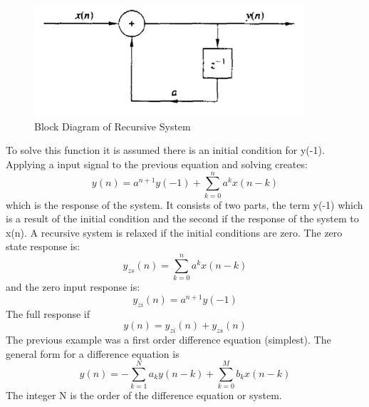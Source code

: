 \documentclass{article} %
\begin{document}
	\begin{figure}[h]
    \centering
	\includegraphics[width=10cm]{feed}
	\caption{Block Diagram of Recursive System}
	\end{figure}
	To solve this function it is assumed there is an initial condition for y(-1). Applying a input signal to the previous equation and solving creates:
	\begin{equation}
 	y(n) = a^{n+1}y(-1) + \sum_{k=0}^{n}a^kx(n-k)
	\end{equation}
	which is the response of the system. It consists of two parts, the term y(-1) which is a result of the initial condition and the second if the response of the system to x(n). A recursive system is relaxed if the initial conditions are zero. The zero state response is:
	\begin{equation}
 	y_{zs}(n) = \sum_{k=0}^{n}a^kx(n-k)
	\end{equation}
	and the zero input response is:
	\begin{equation}
 	y_{zi}(n) = a^{n+1}y(-1)
	\end{equation}
	The full response if 
	\begin{equation}
 	y(n) = y_{zi}(n) + y_{zs}(n)
	\end{equation}
	The previous example was a first order difference equation (simplest). The general form for a difference equation is 
	\begin{equation}
 	y(n) = -\sum_{k=1}^N a_ky(n-k) + \sum_{k=0}^{M}b_k x(n-k)
	\end{equation}
	The integer N is the order of the difference equation or system.
	
\end{document}
